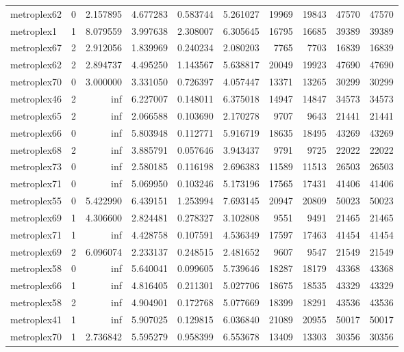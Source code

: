 \begin{longtable}{|l|r|r|r|r|r|r|r|r|r|}
metroplex62 & 0 & 2.157895 & 4.677283 & 0.583744 & 5.261027 & 19969 & 19843 & 47570 & 47570 \\
metroplex1 & 1 & 8.079559 & 3.997638 & 2.308007 & 6.305645 & 16795 & 16685 & 39389 & 39389 \\
metroplex67 & 2 & 2.912056 & 1.839969 & 0.240234 & 2.080203 & 7765 & 7703 & 16839 & 16839 \\
metroplex62 & 2 & 2.894737 & 4.495250 & 1.143567 & 5.638817 & 20049 & 19923 & 47690 & 47690 \\
metroplex70 & 0 & 3.000000 & 3.331050 & 0.726397 & 4.057447 & 13371 & 13265 & 30299 & 30299 \\
metroplex46 & 2 & inf & 6.227007 & 0.148011 & 6.375018 & 14947 & 14847 & 34573 & 34573 \\
metroplex65 & 2 & inf & 2.066588 & 0.103690 & 2.170278 & 9707 & 9643 & 21441 & 21441 \\
metroplex66 & 0 & inf & 5.803948 & 0.112771 & 5.916719 & 18635 & 18495 & 43269 & 43269 \\
metroplex68 & 2 & inf & 3.885791 & 0.057646 & 3.943437 & 9791 & 9725 & 22022 & 22022 \\
metroplex73 & 0 & inf & 2.580185 & 0.116198 & 2.696383 & 11589 & 11513 & 26503 & 26503 \\
metroplex71 & 0 & inf & 5.069950 & 0.103246 & 5.173196 & 17565 & 17431 & 41406 & 41406 \\
metroplex55 & 0 & 5.422990 & 6.439151 & 1.253994 & 7.693145 & 20947 & 20809 & 50023 & 50023 \\
metroplex69 & 1 & 4.306600 & 2.824481 & 0.278327 & 3.102808 & 9551 & 9491 & 21465 & 21465 \\
metroplex71 & 1 & inf & 4.428758 & 0.107591 & 4.536349 & 17597 & 17463 & 41454 & 41454 \\
metroplex69 & 2 & 6.096074 & 2.233137 & 0.248515 & 2.481652 & 9607 & 9547 & 21549 & 21549 \\
metroplex58 & 0 & inf & 5.640041 & 0.099605 & 5.739646 & 18287 & 18179 & 43368 & 43368 \\
metroplex66 & 1 & inf & 4.816405 & 0.211301 & 5.027706 & 18675 & 18535 & 43329 & 43329 \\
metroplex58 & 2 & inf & 4.904901 & 0.172768 & 5.077669 & 18399 & 18291 & 43536 & 43536 \\
metroplex41 & 1 & inf & 5.907025 & 0.129815 & 6.036840 & 21089 & 20955 & 50017 & 50017 \\
metroplex70 & 1 & 2.736842 & 5.595279 & 0.958399 & 6.553678 & 13409 & 13303 & 30356 & 30356 \\

\end{longtable}
